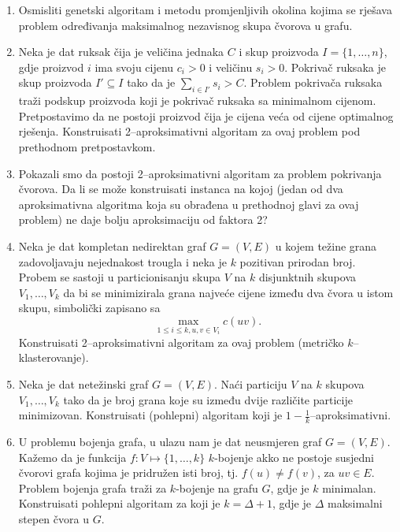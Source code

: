 \documentclass[a4paper, utf8, 11pt, colorlinks]{book}
\theoremstyle{definition}
\begin{document}
\begin{enumerate}
		\item Osmisliti genetski algoritam i metodu promjenljivih okolina kojima se rješava problem određivanja maksimalnog nezavisnog skupa čvorova u grafu.
		\item %
		   Neka je dat ruksak čija je veličina jednaka $C$ i skup proizvoda $I = \{1,\ldots, n\}$, gdje proizvod $i$ ima svoju cijenu $c_i>0$ i veličinu $s_i>0$. Pokrivač ruksaka je skup proizvoda $I' \subseteq I$ tako da je $\sum_{i \in I'} s_i > C$.  Problem pokrivača ruksaka traži podskup proizvoda koji je pokrivač ruksaka sa minimalnom    cijenom.   Pretpostavimo da ne postoji proizvod čija je cijena veća od    cijene optimalnog rješenja. Konstruisati 2--aproksimativni algoritam za ovaj problem pod prethodnom pretpostavkom. 
		   \item Pokazali smo da postoji 2--aproksimativni algoritam za problem pokrivanja čvorova. Da li se može konstruisati instanca na kojoj (jedan od dva aproksimativna algoritma koja su obrađena u prethodnoj glavi za ovaj problem) ne daje bolju aproksimaciju od faktora 2? 
		   \item %
		   Neka je dat kompletan nedirektan graf $G = (V, E)$ u kojem težine grana zadovoljavaju nejednakost trougla i neka je $k$ pozitivan prirodan broj. Probem se sastoji u particionisanju skupa $V$ na $k$ disjunktnih skupova $V_1, \ldots, V_k$ da bi se minimizirala grana najveće cijene između dva čvora u istom skupu,  simbolički zapisano sa
		   $$ \max_{1 \leq i \leq k, u,v \in V_i} c(uv).$$
		   Konstruisati 2--aproksimativni algoritam za ovaj problem (metričko $k$--klasterovanje). 
		\item %
		 Neka je dat netežinski graf $G=(V,E)$. Naći particiju $V$ na $k$ skupova $V_1,\ldots, V_k$ tako da je broj grana koje su između dvije različite particije minimizovan. Konstruisati (pohlepni) algoritam koji je $1-\frac{1}{k}$--aproksimativni. 
		 \item U problemu bojenja grafa, u ulazu nam je dat neusmjeren graf $G = (V,E)$. Kažemo da je funkcija $f:V \mapsto \{1,\ldots, k\}$ $k$-bojenje akko ne postoje susjedni čvorovi grafa kojima je pridružen isti broj, tj. $f(u) \neq f(v)$, za $uv \in E$. Problem bojenja grafa traži za $k$-bojenje na grafu $G$, gdje je $k$ minimalan. Konstruisati pohlepni algoritam za koji je $k = \Delta + 1$, gdje je $\Delta$ maksimalni stepen čvora u $G$. 

\end{enumerate}
\end{document}
